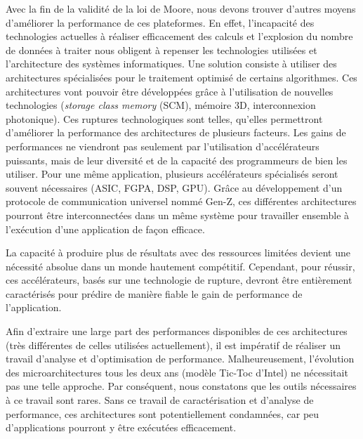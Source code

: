         Avec la fin de la validité de la loi de Moore, nous devons trouver d'autres moyens d'améliorer la performance de ces plateformes. En effet, l’incapacité des technologies actuelles à réaliser efficacement des calculs et l’explosion du nombre de données à traiter nous obligent à repenser les technologies utilisées et l’architecture des systèmes informatiques. Une solution consiste à utiliser des architectures spécialisées pour le traitement optimisé de certains algorithmes.  Ces architectures vont pouvoir être développées grâce à l'utilisation de nouvelles technologies (\textit{storage class memory} (SCM), mémoire 3D, interconnexion photonique). Ces ruptures technologiques sont telles, qu'elles permettront d'améliorer la performance des architectures de plusieurs facteurs. Les gains de performances ne viendront pas seulement par l'utilisation d'accélérateurs puissants, mais de leur diversité et de la capacité des programmeurs de bien les utiliser. Pour une même application, plusieurs accélérateurs spécialisés seront souvent nécessaires (ASIC, FGPA, DSP, GPU). Grâce au développement d'un protocole de communication universel nommé Gen-Z, ces différentes architectures pourront être interconnectées dans un même système pour travailler ensemble à l'exécution d'une application de façon efficace.
        
    
        La capacité à produire plus de résultats avec des ressources limitées devient une nécessité absolue dans un monde hautement compétitif. Cependant, pour réussir, ces accélérateurs, basés sur une technologie de rupture, devront être entièrement caractérisés pour prédire de manière fiable le gain de performance de l'application. 
        
        Afin d'extraire une large part des performances disponibles de ces architectures (très différentes de celles utilisées actuellement), il est impératif de réaliser un travail d'analyse et d'optimisation de performance. 
        Malheureusement, l'évolution des microarchitectures tous les deux ans (modèle Tic-Toc d'Intel) ne nécessitait pas une telle approche. Par conséquent, nous constatons que les outils nécessaires à ce travail sont rares. Sans ce travail de caractérisation et d'analyse de performance, ces architectures sont potentiellement condamnées, car peu d'applications pourront y être exécutées efficacement.
      

